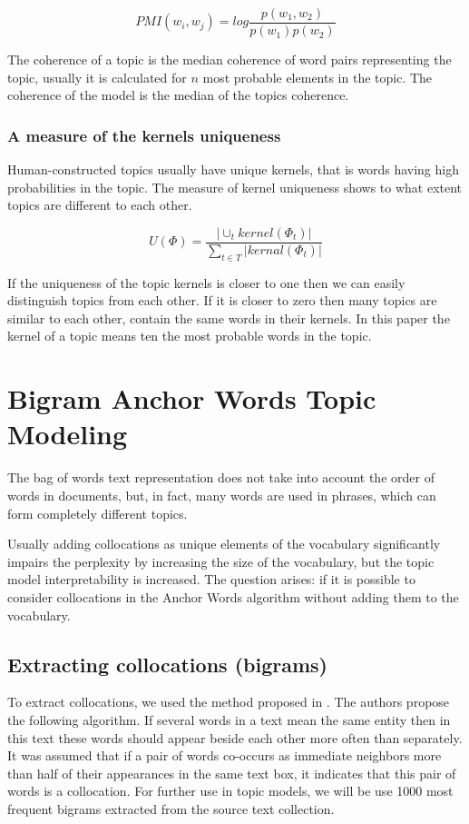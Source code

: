 \documentclass[runningheads,a4paper]{llncs}
\begin{document}
	\begin{equation}
	PMI(w_i, w_j) = log\frac{p(w_1, w_2)}{p(w_1)p(w_2)}
	\end{equation}
	
	The coherence of a topic is the median coherence of word pairs  representing the topic, usually it is calculated for $n$ most probable elements in the topic. The coherence of the model is the median of the topics coherence.
	
	\subsubsection*{A measure of the kernels uniqueness} Human-constructed topics usually have unique kernels, that is words having high probabilities in the topic. The measure of kernel uniqueness shows to what extent topics are different to each other.
    
    \begin{equation}
	U(\Phi) = \frac{|\cup_{t}kernel(\Phi_t)|}{\sum_{t \in T} |kernal(\Phi_t)|}
	\label{uk}
	\end{equation}
	
	If the uniqueness of the topic kernels is closer to one then we can easily distinguish topics from each other. If it is closer to zero then many topics are similar to each other, contain the same words in their kernels. In this paper the kernel of a topic means ten the most probable words in the topic.
	
	\section{Bigram Anchor Words Topic Modeling} 
	The bag of words text representation does not take into account the order of words in documents, but, in fact, many words are used in phrases, which can form completely different topics.
	
	Usually adding collocations as unique elements of the vocabulary significantly impairs the perplexity by increasing the size of the vocabulary, but the topic model interpretability is increased. The question arises: if it is possible to consider  collocations in the Anchor Words algorithm without adding them to the vocabulary.
	
	\subsection{Extracting collocations (bigrams)}
	To extract collocations, we used the method proposed in \cite{dobrov2003forming}. The authors propose the following algorithm. If several words in a text mean the same entity then in this text these words should appear beside each other more often than separately. It was assumed that if a pair of words co-occurs as immediate neighbors more than half of their appearances in the same text box, it indicates that this pair of words is a collocation. For further use in topic models, we will be use 1000 most frequent bigrams extracted from the source text collection.
	
\end{document}
